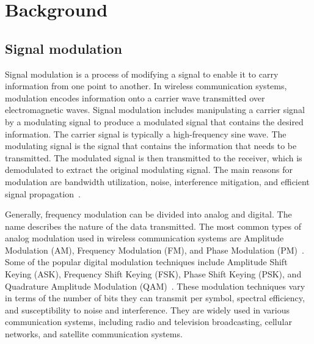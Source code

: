 
\chapter{Background} \label{Chapter 2}

\section{Signal modulation}

Signal modulation is a process of modifying a signal to enable it to carry information from one point to another. In wireless communication systems, modulation encodes information onto a carrier wave transmitted over electromagnetic waves. Signal modulation includes manipulating a carrier signal by a modulating signal to produce a modulated signal that contains the desired information. The carrier signal is typically a high-frequency sine wave. The modulating signal is the signal that contains the information that needs to be transmitted. The modulated signal is then transmitted to the receiver, which is demodulated to extract the original modulating signal. The main reasons for modulation are bandwidth utilization, noise, interference mitigation, and efficient signal propagation~\cite{communication_systems_engineering}.

Generally, frequency modulation can be divided into analog and digital. The name describes the nature of the data transmitted. The most common types of analog modulation used in wireless communication systems are Amplitude Modulation (AM), Frequency Modulation (FM), and Phase Modulation (PM)~\cite{fundamentals_or_wireless}. Some of the popular digital modulation techniques include Amplitude Shift Keying (ASK), Frequency Shift Keying (FSK), Phase Shift Keying (PSK), and Quadrature Amplitude Modulation (QAM)~\cite{communication_systems_engineering,analog_digital_overview}. These modulation techniques vary in terms of the number of bits they can transmit per symbol, spectral efficiency, and susceptibility to noise and interference. They are widely used in various communication systems, including radio and television broadcasting, cellular networks, and satellite communication systems.

